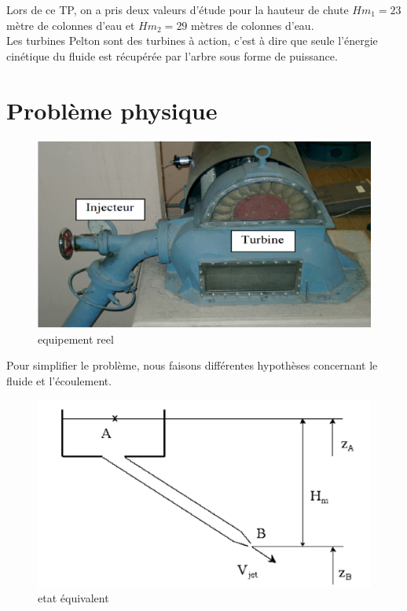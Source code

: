\documentclass[a4paper,10pt]{report} %
\begin{document}
Lors de ce TP, on a pris deux valeurs d'étude pour la hauteur de chute $Hm_1=23$ mètre de colonnes d'eau et $Hm_2=29$ mètres de colonnes d'eau.\\

Les turbines Pelton sont des turbines à action, c'est à dire que seule l'énergie cinétique du fluide est récupérée par l'arbre sous forme de puissance.\\



\section{Problème physique}
\begin{figure}[h!]
\centering
\includegraphics[width=1.0\textwidth]{fig/figure2.png}
\caption{equipement reel}
\end{figure}

Pour simplifier le problème, nous faisons différentes hypothèses concernant le fluide et l'écoulement.


\begin{figure}[h!]
\centering
\includegraphics[width=1.0\textwidth]{fig/figure3.png}
\caption{etat équivalent}
\end{figure}
\end{document}
